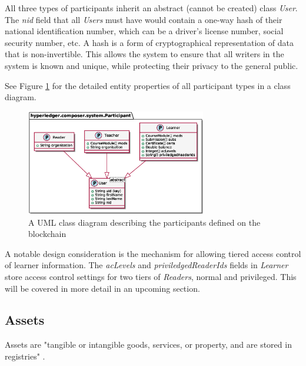 All three types of participants inherit an abstract (cannot be created) class \textit{User}. The \textit{nid} field
that all \textit{Users} must have would contain a one-way hash of their national identification number, which can be a
driver's license number, social security number, etc. A hash is a form
of cryptographical representation of data that is non-invertible. This allows the system to ensure that
all writers in the system is known and unique, while protecting their privacy to the general public.

See Figure \ref{fig:participants} for the detailed entity properties of all participant types
in a class diagram.

\begin{figure}[!ht]
	\centering
	\includegraphics[width=0.7\textwidth]{participants}
	\caption[Participants Class Diagram]
	{A UML class diagram describing the participants defined on the blockchain}
	\label{fig:participants}
\end{figure}

A notable design consideration is the mechanism for allowing tiered access control of
learner information. The \textit{acLevels} and \textit{priviledgedReaderIds} fields in \textit{Learner}
store access control settings for two tiers of \textit{Readers}, normal and privileged.
This will be covered in more detail in an upcoming section.

\subsection{Assets}

Assets are "tangible or intangible goods, services, or property, and are stored in registries" \citep{official2018composer}.

